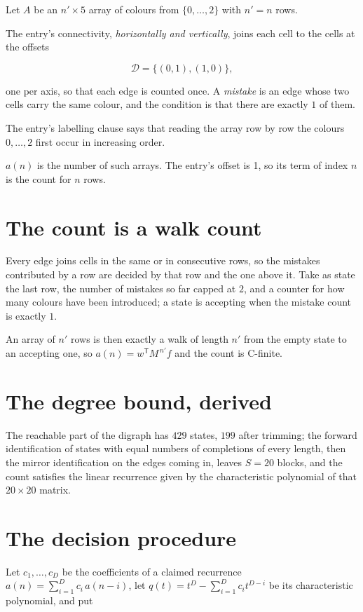 \documentclass[11pt]{article}
\theoremstyle{definition}
\begin{document}
Let $A$ be an $n' \times 5$ array of colours from $\{0,\dots,2\}$ with $n' = n$ rows.

The entry's connectivity, {\itshape horizontally and vertically}, joins each cell to the cells at the offsets

\[\mathcal{D} = \{(0,1), (1,0)\},\]

one per axis, so that each edge is counted once. A {\itshape mistake} is an edge whose two cells carry the same colour, and the condition is that there are exactly $1$ of them.

The entry's labelling clause says that reading the array row by row the colours $0,\dots,2$ first occur in increasing order.

$a(n)$ is the number of such arrays. The entry's offset is 1, so its term of index $n$ is the count for $n$ rows.

\section{The count is a walk count}

Every edge joins cells in the same or in consecutive rows, so the mistakes contributed by a row are decided by that row and the one above it. Take as state the last row, the number of mistakes so far capped at $2$, and a counter for how many colours have been introduced; a state is accepting when the mistake count is exactly $1$.

An array of $n'$ rows is then exactly a walk of length $n'$ from the empty state to an accepting one, so $a(n) = w^{\mathsf T}M^{\,n'}f$ and the count is C-finite.

\section{The degree bound, derived}

The reachable part of the digraph has $429$ states, $199$ after trimming; the forward identification of states with equal numbers of completions of every length, then the mirror identification on the edges coming in, leaves $S = 20$ blocks, and the count satisfies the linear recurrence given by the characteristic polynomial of that $20\times20$ matrix.

\section{The decision procedure}

Let $c_1,\dots,c_D$ be the coefficients of a claimed recurrence $a(n) = \sum_{i=1}^{D} c_i\,a(n-i)$, let $q(t) = t^{D} - \sum_{i=1}^{D} c_i t^{D-i}$ be its characteristic polynomial, and put
\end{document}
